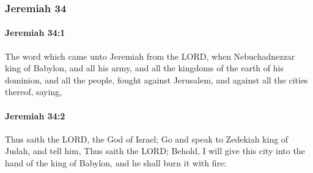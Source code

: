 	\subsubsection{Jeremiah 34} %
		\label{JEREMIAH-34}

		\paragraph{Jeremiah 34:1} %
			\label{JEREMIAH-34-1}

			The word which came unto Jeremiah from the LORD, when Nebuchadnezzar king of Babylon, and all his army, and all the kingdoms of the earth of his dominion, and all the people, fought against Jerusalem, and against all the cities thereof, saying,


		\paragraph{Jeremiah 34:2} %
			\label{JEREMIAH-34-2}

			Thus saith the LORD, the God of Israel; Go and speak to Zedekiah king of Judah, and tell him, Thus saith the LORD; Behold, I will give this city into the hand of the king of Babylon, and he shall burn it with fire:

